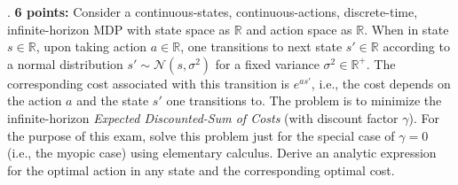 \documentclass[12pt]{exam}
\begin{document}
\begin{questions}
\begin{itemize}
\end{itemize}


\pagebreak
{}. {\bf 6 points:} Consider a continuous-states, continuous-actions, discrete-time, infinite-horizon MDP with state space as $\mathbb{R}$ and action space as $\mathbb{R}$. When in state $s\in \mathbb{R}$, upon taking action $a\in \mathbb{R}$, one transitions to next state $s' \in \mathbb{R}$ according to a normal distribution $s' \sim \mathcal{N}(s, \sigma^2)$ for a fixed variance $\sigma^2 \in \mathbb{R}^+$. The corresponding cost associated with this transition is $e^{as'}$, i.e., the cost depends on the action $a$ and the state $s'$ one transitions to. The problem is to minimize the  infinite-horizon {\em Expected Discounted-Sum of Costs} (with discount factor $\gamma$). For the purpose of this exam, solve this problem just for the special case of $\gamma = 0$ (i.e., the myopic case) using elementary calculus. Derive an analytic expression for the optimal action in any state and the corresponding optimal cost.

 
\end{questions}
\end{document}
